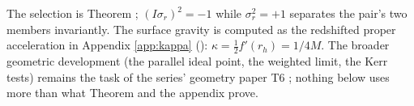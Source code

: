 The selection is Theorem ; $(I\sigma_r)^2 = -1$ while $\sigma_r^2 = +1$ separates the pair's two members invariantly. The surface gravity is computed as the redshifted proper acceleration in Appendix \ref{app:kappa} (): $\kappa = \tfrac12 f'(r_h) = 1/4M$. The broader geometric development (the parallel ideal point, the weighted limit, the Kerr tests) remains the task of the series' geometry paper T6 \cite{ButlerT6}; nothing below uses more than what Theorem  and the appendix prove.
